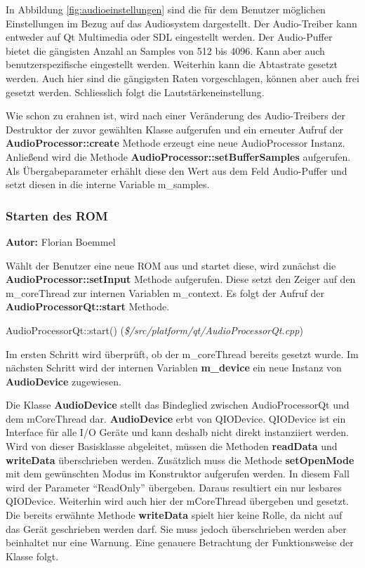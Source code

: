 \documentclass[11pt,a4paper]{scrartcl}
\newcommand{\AutorFlorian} {
    \vspace{-4mm}
    \large \textbf{Autor:} Florian Boemmel \normalsize
    \vspace{2mm}
}
\begin{document}
In Abbildung \ref{fig:audioeinstellungen} sind die f\"ur dem Benutzer m\"oglichen Einstellungen im Bezug auf das Audiosystem dargestellt. Der Audio-Treiber kann entweder auf Qt Multimedia oder SDL eingestellt werden.
Der Audio-Puffer bietet die g\"angisten Anzahl an Samples von 512 bis 4096. Kann aber auch benutzerspezifische eingestellt werden. Weiterhin kann die Abtastrate gesetzt werden. Auch hier sind die g\"angigsten Raten vorgeschlagen, k\"onnen
aber auch frei gesetzt werden. Schlie{ss}lich folgt die Lautst\"arkeneinstellung.

Wie schon zu erahnen ist, wird nach einer Ver\"anderung des Audio-Treibers der Destruktor der zuvor gew\"ahlten Klasse aufgerufen und ein erneuter Aufruf der \textbf{AudioProcessor::create} Methode erzeugt eine neue AudioProcessor Instanz.
Anlie{\ss}end wird die Methode \textbf{AudioProcessor::setBufferSamples} aufgerufen. Als \"Ubergabeparameter erh\"ahlt diese den Wert aus dem Feld Audio-Puffer und setzt diesen in die interne Variable m\_samples.


\subsubsection{Starten des ROM}
\AutorFlorian

W\"ahlt der Benutzer eine neue ROM aus und startet diese, wird zun\"achst die \textbf{AudioProcessor::setInput} Methode aufgerufen. Diese setzt den Zeiger auf den m\_coreThread zur internen Variablen m\_context. Es folgt der Aufruf der
\textbf{AudioProcessorQt::start} Methode.

\vspace{5mm}
\large AudioProcessorQt::start() \normalsize(\textit{\$/src/platform/qt/AudioProcessorQt.cpp})
\vspace{2mm}\newline

Im ersten Schritt wird \"uberpr\"uft, ob der m\_coreThread bereits gesetzt wurde. Im n\"achsten Schritt wird der internen Variablen \textbf{m\_device} ein neue Instanz von \textbf{AudioDevice} zugewiesen.

Die Klasse \textbf{AudioDevice} stellt das Bindeglied zwischen AudioProcessorQt und dem mCoreThread dar. \textbf{AudioDevice} erbt von QIODevice. QIODevice ist ein Interface f\"ur alle I/O Ger\"ate und kann deshalb nicht direkt instanziiert werden.
Wird von dieser Basisklasse abgeleitet, m\"ussen die Methoden \textbf{readData} und \textbf{writeData} \"uberschrieben werden. Zus\"atzlich muss die Methode \textbf{setOpenMode} mit dem gew\"unschten Modus im Konstruktor aufgerufen werden. In diesem Fall wird der Parameter "`ReadOnly"' \"ubergeben. Daraus resultiert ein nur lesbares QIODevice. Weiterhin wird auch hier der mCoreThread \"ubergeben und gesetzt. Die bereits erw\"ahnte Methode \textbf{writeData} spielt hier keine Rolle, da nicht auf das Ger\"at geschrieben werden darf. Sie muss jedoch \"uberschrieben werden aber beinhaltet nur eine Warnung. Eine genauere Betrachtung der Funktionsweise der Klasse folgt.
\end{document}
